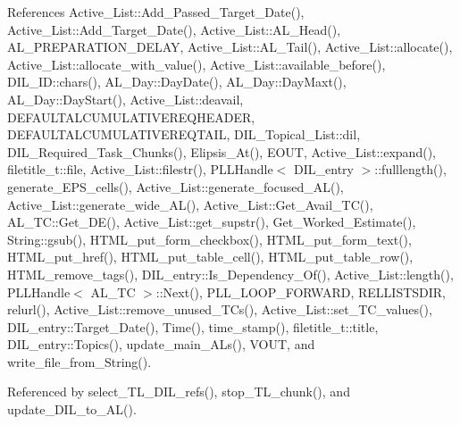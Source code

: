 References Active\_\-List::Add\_\-Passed\_\-Target\_\-Date(), Active\_\-List::Add\_\-Target\_\-Date(), Active\_\-List::AL\_\-Head(), AL\_\-PREPARATION\_\-DELAY, Active\_\-List::AL\_\-Tail(), Active\_\-List::allocate(), Active\_\-List::allocate\_\-with\_\-value(), Active\_\-List::available\_\-before(), DIL\_\-ID::chars(), AL\_\-Day::Day\-Date(), AL\_\-Day::Day\-Maxt(), AL\_\-Day::Day\-Start(), Active\_\-List::deavail, DEFAULTALCUMULATIVEREQHEADER, DEFAULTALCUMULATIVEREQTAIL, DIL\_\-Topical\_\-List::dil, DIL\_\-Required\_\-Task\_\-Chunks(), Elipsis\_\-At(), EOUT, Active\_\-List::expand(), filetitle\_\-t::file, Active\_\-List::filestr(), PLLHandle$<$ DIL\_\-entry $>$::fulllength(), generate\_\-EPS\_\-cells(), Active\_\-List::generate\_\-focused\_\-AL(), Active\_\-List::generate\_\-wide\_\-AL(), Active\_\-List::Get\_\-Avail\_\-TC(), AL\_\-TC::Get\_\-DE(), Active\_\-List::get\_\-supstr(), Get\_\-Worked\_\-Estimate(), String::gsub(), HTML\_\-put\_\-form\_\-checkbox(), HTML\_\-put\_\-form\_\-text(), HTML\_\-put\_\-href(), HTML\_\-put\_\-table\_\-cell(), HTML\_\-put\_\-table\_\-row(), HTML\_\-remove\_\-tags(), DIL\_\-entry::Is\_\-Dependency\_\-Of(), Active\_\-List::length(), PLLHandle$<$ AL\_\-TC $>$::Next(), PLL\_\-LOOP\_\-FORWARD, RELLISTSDIR, relurl(), Active\_\-List::remove\_\-unused\_\-TCs(), Active\_\-List::set\_\-TC\_\-values(), DIL\_\-entry::Target\_\-Date(), Time(), time\_\-stamp(), filetitle\_\-t::title, DIL\_\-entry::Topics(), update\_\-main\_\-ALs(), VOUT, and write\_\-file\_\-from\_\-String().

Referenced by select\_\-TL\_\-DIL\_\-refs(), stop\_\-TL\_\-chunk(), and update\_\-DIL\_\-to\_\-AL().



